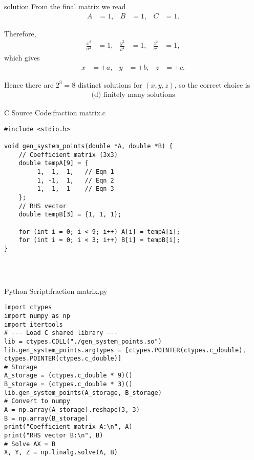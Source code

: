 \documentclass{beamer}
\numberwithin{equation}{section}
\theoremstyle{remark}
\begin{document}
\begin{frame}{solution}
From the final matrix we read
\begin{align}
A &= 1, & B &= 1, & C &= 1.
\end{align}

Therefore,
\begin{align}
\frac{x^2}{a^2} &= 1, & \frac{y^2}{b^2} &= 1, & \frac{z^2}{c^2} &= 1,
\end{align}
which gives
\begin{align}
x &= \pm a, & y &= \pm b, & z &= \pm c.
\end{align}

Hence there are $2^3=8$ distinct solutions for $(x,y,z)$, so the correct choice is
\begin{align}
\boxed{\text{(d) finitely many solutions}}
\end{align}

\end{frame}
\begin{frame}[fragile]{C Source Code:fraction matrix.c}
\begin{verbatim}
#include <stdio.h>

void gen_system_points(double *A, double *B) {
    // Coefficient matrix (3x3)
    double tempA[9] = {
         1,  1, -1,   // Eqn 1
         1, -1,  1,   // Eqn 2
        -1,  1,  1    // Eqn 3
    };
    // RHS vector
    double tempB[3] = {1, 1, 1};

    for (int i = 0; i < 9; i++) A[i] = tempA[i];
    for (int i = 0; i < 3; i++) B[i] = tempB[i];
}




\end{verbatim}
\end{frame}

\begin{frame}[fragile]{Python Script:fraction matrix.py}
\begin{verbatim}
import ctypes
import numpy as np
import itertools
# --- Load C shared library ---
lib = ctypes.CDLL("./gen_system_points.so")
lib.gen_system_points.argtypes = [ctypes.POINTER(ctypes.c_double), ctypes.POINTER(ctypes.c_double)]
# Storage
A_storage = (ctypes.c_double * 9)()
B_storage = (ctypes.c_double * 3)()
lib.gen_system_points(A_storage, B_storage)
# Convert to numpy
A = np.array(A_storage).reshape(3, 3)
B = np.array(B_storage)
print("Coefficient matrix A:\n", A)
print("RHS vector B:\n", B)
# Solve AX = B
X, Y, Z = np.linalg.solve(A, B)

\end{verbatim}
\end{frame}
\end{document}
